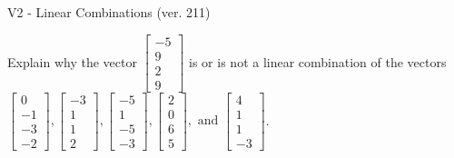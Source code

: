 \begin{exercise}
  \begin{exerciseTitle}V2 - Linear Combinations (ver. 211)\end{exerciseTitle}
  \begin{exerciseStatement}
    Explain why the vector \(\left[\begin{array}{c}
-5 \\
9 \\
2 \\
9
\end{array}\right]\)  is or is not a linear 
	combination of the vectors \(\left[\begin{array}{c}
0 \\
-1 \\
-3 \\
-2
\end{array}\right] , \left[\begin{array}{c}
-3 \\
1 \\
1 \\
2
\end{array}\right] , \left[\begin{array}{c}
-5 \\
1 \\
-5 \\
-3
\end{array}\right] , \left[\begin{array}{c}
2 \\
0 \\
6 \\
5
\end{array}\right] , \text{ and } \left[\begin{array}{c}
4 \\
1 \\
1 \\
-3
\end{array}\right]\).
	



\end{exerciseStatement}
\end{exercise}
